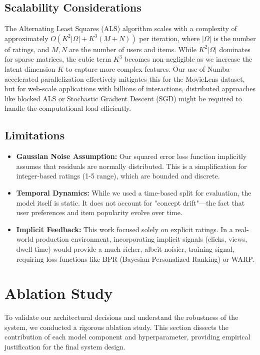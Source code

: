 \documentclass{article}
\theoremstyle{plain}
\theoremstyle{definition}
\theoremstyle{remark}
\begin{document}
\subsection{Scalability Considerations}
The Alternating Least Squares (ALS) algorithm scales with a complexity of approximately $O(K^2 |\Omega| + K^3 (M+N))$ per iteration, where $|\Omega|$ is the number of ratings, and $M, N$ are the number of users and items. While $K^2 |\Omega|$ dominates for sparse matrices, the cubic term $K^3$ becomes non-negligible as we increase the latent dimension $K$ to capture more complex features. Our use of Numba-accelerated parallelization effectively mitigates this for the MovieLens dataset, but for web-scale applications with billions of interactions, distributed approaches like blocked ALS or Stochastic Gradient Descent (SGD) might be required to handle the computational load efficiently.

\subsection{Limitations}
\begin{itemize}
    \item \textbf{Gaussian Noise Assumption:} Our squared error loss function implicitly assumes that residuals are normally distributed. This is a simplification for integer-based ratings (1-5 range), which are bounded and discrete.
    \item \textbf{Temporal Dynamics:} While we used a time-based split for evaluation, the model itself is static. It does not account for "concept drift"—the fact that user preferences and item popularity evolve over time.
    \item \textbf{Implicit Feedback:} This work focused solely on explicit ratings. In a real-world production environment, incorporating implicit signals (clicks, views, dwell time) would provide a much richer, albeit noisier, training signal, requiring loss functions like BPR (Bayesian Personalized Ranking) or WARP.
\end{itemize}


\section{Ablation Study}
\label{sec:ablation}
To validate our architectural decisions and understand the robustness of the system, we conducted a rigorous ablation study. This section dissects the contribution of each model component and hyperparameter, providing empirical justification for the final system design.
\end{document}
